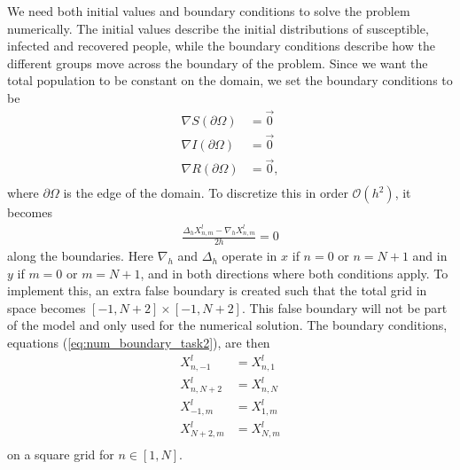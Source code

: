 We need both initial values and boundary conditions to solve the problem numerically.
The initial values describe the initial distributions of susceptible, infected and recovered people, while
the boundary conditions describe how the different groups move across the boundary of the problem. Since we want the total population to be constant on the domain, we set the boundary conditions to be
\begin{equation}
    \begin{split}
        \nabla S(\partial\Omega) &= \Vec{0} \\
        \nabla I(\partial\Omega) &= \Vec{0} \\
        \nabla R(\partial\Omega) &= \Vec{0}, \\
    \end{split}
\end{equation}
where $\partial\Omega$ is the edge of the domain. 
To discretize this in order $\mathcal{O}(h^2)$, it becomes
\begin{equation}
    \label{eq:num_boundary_task2}
    \begin{split}
        \frac{\Delta_h X_{n,m}^l - \nabla_h X_{n,m}^l}{2h} = 0
    \end{split}
\end{equation}
along the boundaries. Here $\nabla_h$ and $\Delta_h$ operate in $x$ if $n=0$ or $n=N+1$ and in $y$ if $m = 0$ or $m=N+1$, and in both directions where both conditions apply.
To implement this, an extra false boundary is created such that the total grid in space becomes $[-1, N+2] \times [-1, N+2]$. This false boundary will not be part of the model and only used for the numerical solution.
The boundary conditions, equations (\ref{eq:num_boundary_task2}), are then
\begin{equation}
    \begin{split}
        X_{n,-1}^l &= X_{n, 1}^l \\
        X_{n,N+2}^l &= X_{n, N}^l \\
        X_{-1,m}^l &= X_{1, m}^l \\
        X_{N+2,m}^l &= X_{N, m}^l \\
    \end{split}
\end{equation}
on a square grid for $n \in [1, N]$.

